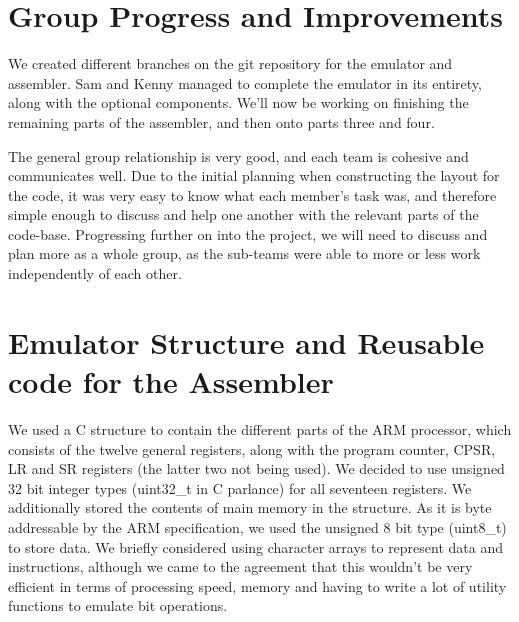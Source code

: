 \documentclass[a4paper]{article}
\begin{document}
\section{Group Progress and Improvements}
We created different branches on the git repository for the emulator and assembler. Sam and Kenny managed to complete the emulator in its entirety, along with the optional components. We'll now be working on finishing the remaining parts of the assembler, and then onto parts three and four. 

The general group relationship is very good, and each team is cohesive and communicates well. Due to the initial planning when constructing the layout for the code, it was very easy to know what each member's task was, and therefore simple enough to discuss and help one another with the relevant parts of the code-base. Progressing further on into the project, we will need to discuss and plan more as a whole group, as the sub-teams were able to more or less work independently of each other. 

\section{Emulator Structure and Reusable code for the Assembler}

We used a C structure to contain the different parts of the  ARM processor, which consists of the twelve general registers, along with the program counter, CPSR, LR and SR registers (the latter two not being used). We decided to use unsigned $32$ bit integer types (uint32\_t in C parlance) for all seventeen registers. We additionally stored the contents of main memory in the structure. As it is byte addressable by the ARM specification, we used the unsigned 8 bit type (uint8\_t) to store data. We briefly considered using character arrays to represent data and instructions, although we came to the agreement that this wouldn't be very efficient in terms of processing speed, memory and having to write a lot of utility functions to emulate bit operations.
\end{document}
